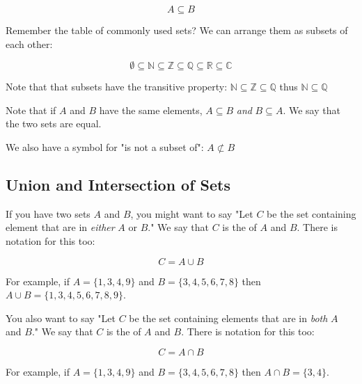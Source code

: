 $$ A \subseteq B$$

Remember the table of commonly used sets?  We can arrange them as
subsets of each other:

$$\emptyset \subseteq \mathbb{N} \subseteq \mathbb{Z} \subseteq \mathbb{Q} \subseteq \mathbb{R} \subseteq \mathbb{C}$$

Note that that subsets have the transitive property: $\mathbb{N}
\subseteq \mathbb{Z} \subseteq \mathbb{Q}$ thus $\mathbb{N} \subseteq
\mathbb{Q}$

Note that if $A$ and $B$ have the same elements, $A \subseteq B$
\textit{ and } $B \subseteq A$.  We say that the two sets are equal.

We also have a symbol for "is not a subset of": $A \not\subset B$

\subsection{Union and Intersection of Sets}

If you have two sets $A$ and $B$, you might want to say "Let $C$ be
the set containing element that are in \textit{either} $A$ or $B$."
We say that $C$ is the  of $A$ and $B$.  There is
notation for this too:

$$C = A \cup B$$

For example,  if $A = \{1,3,4,9\}$ and $B = \{3,4,5,6,7,8\}$  then $A \cup B =  \{1,3,4,5,6,7,8,9\}$.

You also want to say "Let $C$ be the set containing elements that are
in \textit{both} $A$ and $B$."  We say that $C$ is the
 of $A$ and $B$.  There is notation for this
too:

$$C = A \cap B$$

For example,  if $A = \{1,3,4,9\}$ and $B = \{3,4,5,6,7,8\}$  then $A \cap B =  \{3,4\}$.


